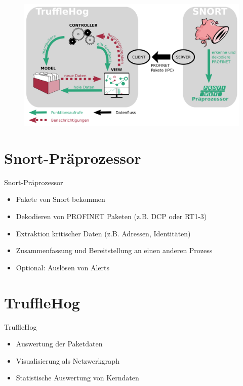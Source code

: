 \documentclass[18pt]{beamer}
\begin{document}
\begin{frame}
    \begin{figure}
    	\centering
    	\includegraphics[width=\textwidth]{./images/jan_12.png}
    \end{figure}
\end{frame}


\section{Snort-Präprozessor}
\begin{frame}{Snort-Präprozessor}
    \begin{itemize}
      \item Pakete von Snort bekommen
      \pause
      \item Dekodieren von PROFINET Paketen (z.B. DCP oder RT1-3)
      \pause
      \item Extraktion kritischer Daten (z.B. Adressen, Identitäten)
      \pause
      \item Zusammenfassung und Bereitstellung an einen anderen Prozess
      \pause
      \item Optional: Auslösen von Alerts
    \end{itemize}
\end{frame}


\section{TruffleHog}
\begin{frame}{TruffleHog}
    \begin{itemize}
      \item Auswertung der Paketdaten
      \pause
      \item Visualisierung als Netzwerkgraph
      \pause
	  \item Statistische Auswertung von Kerndaten
    \end{itemize}
\end{frame}
\end{document}
